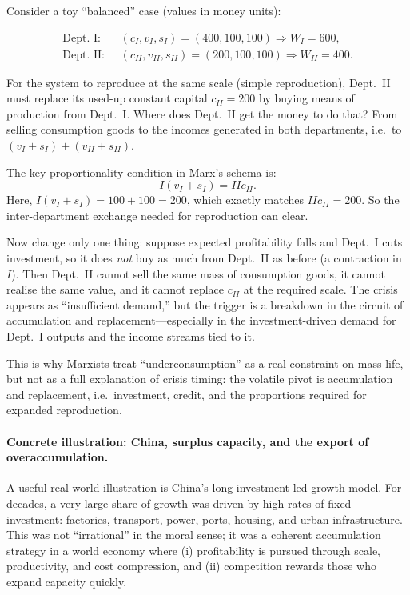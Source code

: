 \begin{example}
Consider a toy “balanced” case (values in money units):

\begin{align*}
\text{Dept.\ I: } \;&(c_I,v_I,s_I)=(400,100,100) \Rightarrow W_I=600,\\
\text{Dept.\ II: } \;&(c_{II},v_{II},s_{II})=(200,100,100) \Rightarrow W_{II}=400.
\end{align*}

For the system to reproduce at the same scale (simple reproduction), Dept.\ II must replace its
used-up constant capital $c_{II}=200$ by buying means of production from Dept.\ I.
Where does Dept.\ II get the money to do that? From selling consumption goods to the incomes
generated in both departments, i.e.\ to $(v_I+s_I)+(v_{II}+s_{II})$.

The key proportionality condition in Marx’s schema is:
\[
  I(v_I+s_I) = IIc_{II}.
\]
Here, $I(v_I+s_I)=100+100=200$, which exactly matches $IIc_{II}=200$.
So the inter-department exchange needed for reproduction can clear.

Now change only one thing: suppose expected profitability falls and Dept.\ I cuts investment,
so it does \emph{not} buy as much from Dept.\ II as before (a contraction in $I$).
Then Dept.\ II cannot sell the same mass of consumption goods, it cannot realise the same value,
and it cannot replace $c_{II}$ at the required scale. The crisis appears as “insufficient demand,”
but the trigger is a breakdown in the circuit of accumulation and replacement---especially in the
investment-driven demand for Dept.\ I outputs and the income streams tied to it.
\end{example}

This is why Marxists treat “underconsumption” as a real constraint on mass life, but not as a full
explanation of crisis timing: the volatile pivot is accumulation and replacement, i.e.\ investment,
credit, and the proportions required for expanded reproduction.

\paragraph{Concrete illustration: China, surplus capacity, and the export of overaccumulation.}
A useful real-world illustration is China’s long investment-led growth model.
For decades, a very large share of growth was driven by high rates of fixed investment:
factories, transport, power, ports, housing, and urban infrastructure.
This was not “irrational” in the moral sense; it was a coherent accumulation strategy in a
world economy where (i) profitability is pursued through scale, productivity, and cost
compression, and (ii) competition rewards those who expand capacity quickly.

